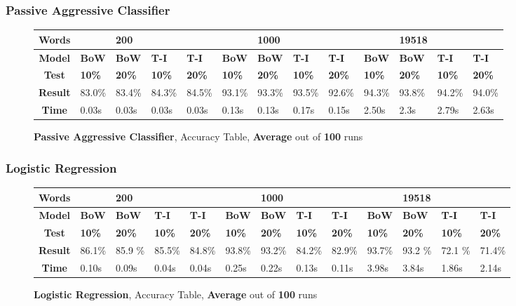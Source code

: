 \documentclass{article}
\begin{document}
	\subsubsection{Passive Aggressive Classifier}
	\begin{figure}[H]
		\begin{tabular}{||c||l|l|l|l||l|l|l|l||l|l|l|l||}
			\hline
			\textbf{Words} &  & \textbf{200} & & & &\textbf{1000} & & & & \textbf{19518} &  & \\ \hline 
			\textbf{Model} & \textbf{BoW} & \textbf{BoW} & \textbf{T-I} & \textbf{T-I} &\textbf{BoW} & \textbf{BoW} & \textbf{T-I} & \textbf{T-I} & \textbf{BoW} & \textbf{BoW} & \textbf{T-I} & \textbf{T-I}\\ \hline
			\textbf{Test} & \textbf{10\%} & \textbf{20\%} & \textbf{10\%} & \textbf{20\%} & \textbf{10\%} & \textbf{20\%} & \textbf{10\%} & \textbf{20\%} & \textbf{10\%} & \textbf{20\%} & \textbf{10\%} & \textbf{20\%} \\ \hline \hline  
			\textbf{Result} & 83.0\% & 83.4\% & 84.3\% & 84.5\% & 93.1\% & 93.3\% & 93.5\% & 92.6\% & 94.3\% & 93.8\% & 94.2\% & 94.0\% \\ \hline 
			\textbf{Time} & 0.03s & 0.03s & 0.03s & 0.03s & 0.13s & 0.13s & 0.17s & 0.15s & 2.50s & 2.3s & 2.79s & 2.63s \\ \hline 
		\end{tabular}
		\caption{\textbf{Passive Aggressive Classifier}, Accuracy Table, \textbf{Average} out of \textbf{100} runs}
	\end{figure}    
    
	\subsubsection{Logistic Regression}
	\begin{figure}[H]
		\begin{tabular}{||c||l|l|l|l||l|l|l|l||l|l|l|l||}
			\hline
			\textbf{Words} &  & \textbf{200} & & & &\textbf{1000} & & & & \textbf{19518} &  & \\ \hline 
			\textbf{Model} & \textbf{BoW} & \textbf{BoW} & \textbf{T-I} & \textbf{T-I} &\textbf{BoW} & \textbf{BoW} & \textbf{T-I} & \textbf{T-I} & \textbf{BoW} & \textbf{BoW} & \textbf{T-I} & \textbf{T-I}\\ \hline
			\textbf{Test} & \textbf{10\%} & \textbf{20\%} & \textbf{10\%} & \textbf{20\%} & \textbf{10\%} & \textbf{20\%} & \textbf{10\%} & \textbf{20\%} & \textbf{10\%} & \textbf{20\%} & \textbf{10\%} & \textbf{20\%} \\ \hline \hline  
			\textbf{Result} & 86.1\% &85.9 \% & 85.5\% & 84.8\% &93.8\% &93.2\% &84.2\% & 82.9\% & 93.7\% &93.2 \% &72.1 \% &71.4\% \\ \hline 
			\textbf{Time} & 0.10s & 0.09s & 0.04s & 0.04s & 0.25s & 0.22s & 0.13s &0.11s & 3.98s & 3.84s & 1.86s & 2.14s \\ \hline 
		\end{tabular}
		\caption{\textbf{Logistic Regression}, Accuracy Table, \textbf{Average} out of \textbf{100} runs}
	\end{figure} 
\end{document}

